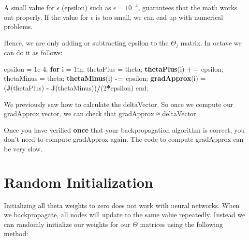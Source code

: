 \documentclass[
]{book}
\newenvironment{Shaded}{\begin{snugshade}}{\end{snugshade}}
\newcommand{\ControlFlowTok}[1]{\textcolor[rgb]{0.13,0.29,0.53}{\textbf{#1}}}
\newcommand{\DecValTok}[1]{\textcolor[rgb]{0.00,0.00,0.81}{#1}}
\newcommand{\ErrorTok}[1]{\textcolor[rgb]{0.64,0.00,0.00}{\textbf{#1}}}
\newcommand{\FloatTok}[1]{\textcolor[rgb]{0.00,0.00,0.81}{#1}}
\newcommand{\KeywordTok}[1]{\textcolor[rgb]{0.13,0.29,0.53}{\textbf{#1}}}
\newcommand{\NormalTok}[1]{#1}
\newcommand{\OperatorTok}[1]{\textcolor[rgb]{0.81,0.36,0.00}{\textbf{#1}}}
\newcommand{\StringTok}[1]{\textcolor[rgb]{0.31,0.60,0.02}{#1}}
\begin{document}
A small value for \({\epsilon}\) (epsilon) such as \({\epsilon = 10^{-4}}\), guarantees that the math works out properly. If the value for \(\epsilon\) is too small, we can end up with numerical problems.

Hence, we are only adding or subtracting epsilon to the \(\Theta_j\) matrix. In octave we can do it as follows:

\begin{Shaded}
\begin{Highlighting}[]
\NormalTok{epsilon =}\StringTok{ }\FloatTok{1e-4}\NormalTok{;}
\ControlFlowTok{for}\NormalTok{ i =}\StringTok{ }\DecValTok{1}\OperatorTok{:}\NormalTok{n,}
\NormalTok{  thetaPlus =}\StringTok{ }\NormalTok{theta;}
  \KeywordTok{thetaPlus}\NormalTok{(i) }\OperatorTok{+}\ErrorTok{=}\StringTok{ }\NormalTok{epsilon;}
\NormalTok{  thetaMinus =}\StringTok{ }\NormalTok{theta;}
  \KeywordTok{thetaMinus}\NormalTok{(i) }\OperatorTok{-}\ErrorTok{=}\StringTok{ }\NormalTok{epsilon;}
  \KeywordTok{gradApprox}\NormalTok{(i) =}\StringTok{ }\NormalTok{(}\KeywordTok{J}\NormalTok{(thetaPlus) }\OperatorTok{-}\StringTok{ }\KeywordTok{J}\NormalTok{(thetaMinus))}\OperatorTok{/}\NormalTok{(}\DecValTok{2}\OperatorTok{*}\NormalTok{epsilon)}
\NormalTok{end;}
\end{Highlighting}
\end{Shaded}

We previously saw how to calculate the deltaVector. So once we compute our gradApprox vector, we can check that gradApprox ≈ deltaVector.

Once you have verified \textbf{once} that your backpropagation algorithm is correct, you don't need to compute gradApprox again. The code to compute gradApprox can be very slow.

\hypertarget{random-initialization}{%
\section{Random Initialization}\label{random-initialization}}

Initializing all theta weights to zero does not work with neural networks. When we backpropagate, all nodes will update to the same value repeatedly. Instead we can randomly initialize our weights for our \(\Theta\) matrices using the following method:
\end{document}
